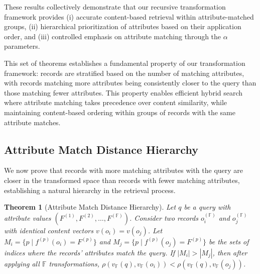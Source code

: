 \documentclass[numbers,sort]{article}
\newtheorem{theorem}{Theorem}
\begin{document}
These results collectively demonstrate that our recursive transformation framework provides (i) accurate content-based retrieval within attribute-matched groups, (ii) hierarchical prioritization of attributes based on their application order, and (iii) controlled emphasis on attribute matching through the $\alpha$ parameters.

This set of theorems establishes a fundamental property of our transformation framework: records are stratified based on the number of matching attributes, with records matching more attributes being consistently closer to the query than those matching fewer attributes. This property enables efficient hybrid search where attribute matching takes precedence over content similarity, while maintaining content-based ordering within groups of records with the same attribute matches.

\subsection{Attribute Match Distance Hierarchy}

We now prove that records with more matching attributes with the query are closer in the transformed space than records with fewer matching attributes, establishing a natural hierarchy in the retrieval process.

\begin{theorem}[Attribute Match Distance Hierarchy]
\label{thm:match-hierarchy}
Let $q$ be a query with attribute values $(F^{(1)}, F^{(2)}, \ldots, F^{(\mathbb{F})})$. Consider two records $o_i^{(\mathbb{F})}$ and $o_j^{(\mathbb{F})}$ with identical content vectors $v(o_i) = v(o_j)$. Let $M_i = \{p \mid f^{(p)}(o_i) = F^{(p)}\}$ and $M_j = \{p \mid f^{(p)}(o_j) = F^{(p)}\}$ be the sets of indices where the records' attributes match the query. If $|M_i| > |M_j|$, then after applying all $\mathbb{F}$ transformations, $\rho(v_{\mathbb{F}}(q), v_{\mathbb{F}}(o_i)) < \rho(v_{\mathbb{F}}(q), v_{\mathbb{F}}(o_j))$.
\end{theorem}
\end{document}
